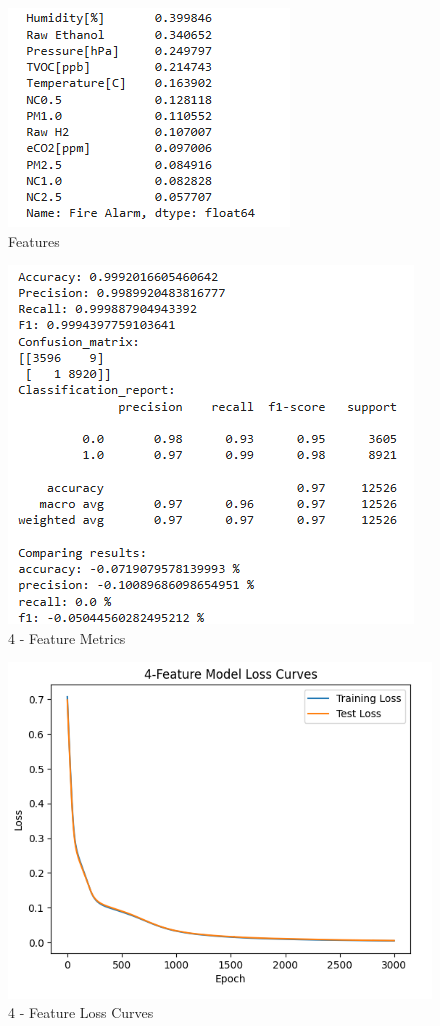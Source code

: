 \documentclass[conference]{IEEEtran}
\begin{document}
\begin{figure}
    \centering
    \includegraphics[width=0.7\linewidth]{images/Corr.png}
    \caption{Features}
    \label{fig:2.0-label}
\end{figure}

\begin{figure}
    \centering
    \includegraphics[width=0.75\linewidth]{images/4metric.png}
    \caption{4 - Feature Metrics}
    \label{fig:3.0}
\end{figure}

\begin{figure}
    \centering
    \includegraphics[width=0.75\linewidth]{images/4LC.png}
    \caption{4 - Feature Loss Curves}
    \label{fig:3.1}
\end{figure}
\end{document}
